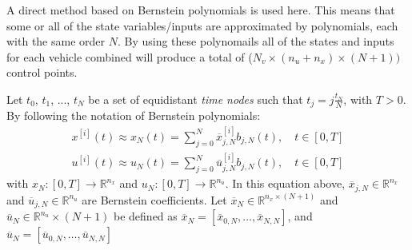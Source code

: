 \par A direct method based on Bernstein polynomials is used here. This means that some or all of the state variables/inputs are approximated by polynomials, each with the same order $N$. By using these polynomails all of the states and inputs for each vehicle combined will produce a total of ($N_v \times (n_u+n_x)\times (N+1))$ control points.
\par Let $t_0$, $t_1$, ..., $t_N$ be a set of equidistant \textit{time nodes} such that $t_j= j\frac{t_N}{N}$, with $T>0$. By following the notation of Bernstein polynomials:
\begin{equation}
    \begin{gathered}
        x^{[i]}(t) \approx x_N(t) = \sum_{j=0}^N \overline{x}^{[i]}_{j,N} b_{j,N}(t), \quad t\in[0,T] \\
        u^{[i]}(t) \approx u_N(t) = \sum_{j=0}^N \overline{u}^{[i]}_{j,N} b_{j,N}(t), \quad t\in[0,T]
    \end{gathered}
\end{equation}
with $x_N: [0,T]\rightarrow \mathbb{R}^{n_x}$ and $u_N:[0,T]\rightarrow \mathbb{R}^{n_u}$. In this equation above, $\overline{x}_{j,N}\in \mathbb{R}^{n_x}$ and $\overline{u}_{j,N}\in \mathbb{R}^{n_u}$ are Bernstein coefficients. Let $\overline{x}_N\in \mathbb{R}^{n_x\times (N+1)}$ and $\overline{u}_N\in \mathbb{R}^{n_u}\times(N+1)$ be defined as $\overline{x}_N = [\overline{x}_{0,N},\dots, \overline{x}_{N,N}]$, and $\overline{u}_N = [\overline{u}_{0,N},\dots, \overline{u}_{N,N}]$

